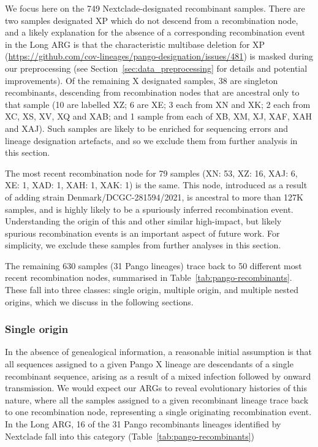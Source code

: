 \documentclass{article}
\begin{document}
We focus here on the 749 Nextclade-designated recombinant samples.
There are two samples designated XP which do not descend from a recombination node, 
and a likely
explanation for the absence of a corresponding recombination event in the Long ARG
is that the characteristic multibase deletion for XP
(\url{https://github.com/cov-lineages/pango-designation/issues/481}) is masked
during our preprocessing (see Section~\ref{sec:data_preprocessing} for details and potential
improvements). Of the remaining X designated samples, 38 are singleton recombinants,
descending
from recombination nodes that are ancestral only to that sample (10 are labelled XZ; 6
are XE;  3 each from XN and XK; 2 each from XC, XS, XV, XQ and XAB; and 1
sample from each of XB, XM, XJ, XAF, XAH and XAJ). Such samples are likely to
be enriched for sequencing errors and lineage designation artefacts, and so we
exclude them from further analysis in this section.

The most recent recombination node for 79 samples (XN: 53, XZ: 16, XAJ: 6, XE:
1, XAD: 1, XAH: 1, XAK: 1) is the same. This node, introduced as a
result of adding strain
Denmark/DCGC-281594/2021, is ancestral to more than 127K samples,
and is highly likely to be a spuriously inferred recombination event.
Understanding the origin of this
and other similar high-impact, but likely spurious recombination
events is an important aspect of future work.
For simplicity, we exclude these samples from further analyses in
this section.

The remaining 630 samples (31 Pango lineages) trace back to 50 different
most recent recombination nodes, summarised
in Table~\ref{tab:pango-recombinants}.
These fall into three classes: single origin, multiple origin,
and multiple nested origins, which we discuss in the following sections.

\subsubsection{Single origin}
In the absence of genealogical information, a reasonable initial assumption is
that all sequences
assigned to a given Pango X lineage are descendants of a single recombinant
sequence, arising as a result of a mixed infection followed by onward
transmission. We would expect our ARGs to reveal evolutionary histories of this
nature, where all the samples assigned to a given recombinant lineage
trace back to one recombination node, representing a single originating
recombination event. In the Long ARG, 16 of the 31 Pango recombinants lineages identified by Nextclade
fall into this category (Table~\ref{tab:pango-recombinants})
\end{document}

